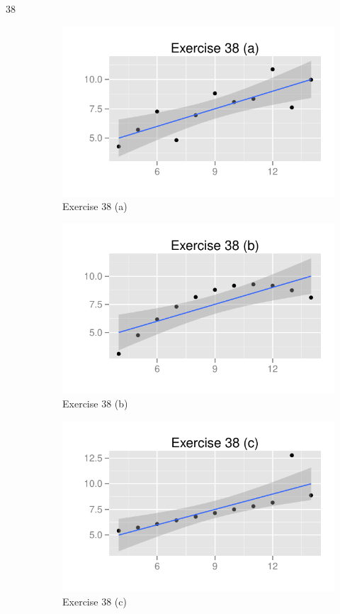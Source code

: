 \documentclass[letterpaper]{exam}
\begin{document}
\begin{description}
      \item[38]
        \begin{figure}[H]
          \centering
          \includegraphics{figures/ex38a.pdf}
          \caption{Exercise 38 (a)}
        \end{figure}

        \begin{figure}[H]
          \centering
          \includegraphics{figures/ex38b.pdf}
          \caption{Exercise 38 (b)}
        \end{figure}

        \begin{figure}[H]
          \centering
          \includegraphics{figures/ex38c.pdf}
          \caption{Exercise 38 (c)}
        \end{figure}


\end{description}
\end{document}

